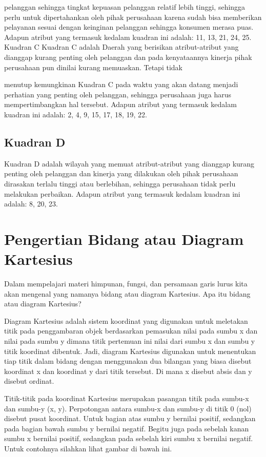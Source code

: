 pelanggan sehingga tingkat kepuasan pelanggan relatif lebih tinggi, sehingga perlu untuk dipertahankan oleh pihak perusahaan karena sudah bisa memberikan pelayanan
sesuai dengan keinginan pelanggan sehingga konsumen merasa puas. Adapun atribut yang termasuk kedalam kuadran ini adalah: 11, 13, 21, 24, 25.
Kuadran C
Kuadran C adalah Daerah yang berisikan atribut-atribut yang dianggap kurang penting oleh pelanggan dan pada kenyataannya kinerja pihak perusahaan pun dinilai kurang memuaskan. Tetapi tidak

menutup kemungkinan Kuadran C pada waktu yang akan datang menjadi perhatian yang penting oleh pelanggan, sehingga perusahaan juga harus mempertimbangkan
hal tersebut. Adapun atribut yang termasuk kedalam kuadran ini adalah: 2, 4, 9, 15, 17, 18, 19, 22.
\subsection{Kuadran D}
Kuadran D adalah wilayah yang memuat atribut-atribut yang dianggap kurang penting oleh pelanggan dan kinerja yang dilakukan oleh pihak perusahaan dirasakan
terlalu tinggi atau berlebihan, sehingga perusahaan tidak perlu melakukan perbaikan. Adapun atribut yang termasuk kedalam kuadran ini adalah: 8, 20, 23.

\section{Pengertian Bidang atau Diagram Kartesius}

Dalam mempelajari materi himpunan, fungsi, dan persamaan garis lurus kita akan mengenal yang namanya bidang atau diagram Kartesius. Apa itu bidang atau diagram Kartesius?

Diagram Kartesius adalah sistem koordinat yang digunakan untuk meletakan titik pada penggambaran objek berdasarkan pemasukan nilai pada sumbu x dan nilai pada sumbu y dimana titik pertemuan ini nilai dari sumbu x dan sumbu y titik koordinat dibentuk. Jadi, diagram Kartesius digunakan untuk menentukan tiap titik dalam bidang dengan menggunakan dua bilangan yang biasa disebut koordinat x dan koordinat y dari titik tersebut. Di mana x disebut absis dan y disebut ordinat.


Titik-titik pada koordinat Kartesius merupakan pasangan titik pada sumbu-x dan sumbu-y (x, y). Perpotongan antara sumbu-x dan sumbu-y di titik 0 (nol) disebut pusat koordinat. Untuk bagian atas sumbu y bernilai positif, sedangkan pada bagian bawah sumbu y bernilai negatif. Begitu juga pada sebelah kanan sumbu x bernilai positif, sedangkan pada sebelah kiri sumbu x bernilai negatif. Untuk contohnya silahkan lihat gambar di bawah ini. 

